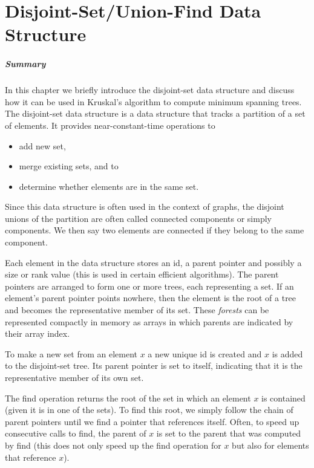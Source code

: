 \renewcommand\chapterformat{\thechapter\quad}
\chapter{Disjoint-Set/Union-Find Data Structure}

\paragraph{Summary}
In this chapter we briefly introduce the disjoint-set data structure and discuss
how it can be used in Kruskal's algorithm to compute minimum spanning trees.
\\

\noindent The disjoint-set data structure is a data structure that tracks a
partition of a set of elements. It provides near-constant-time operations to
\begin{itemize}
\item add new set,
\item merge existing sets, and to
\item determine whether elements are in the same set.
\end{itemize}
Since this data structure is often used in the context of graphs, the disjoint
unions of the partition are often called connected components or simply
components. We then say two elements are connected if they belong to the same
component.

Each element in the data structure stores an id, a parent pointer and possibly a
size or rank value (this is used in certain efficient algorithms). The parent
pointers are arranged to form one or more trees, each representing a set. If an
element's parent pointer points nowhere, then the element is the root of a tree
and becomes the representative member of its set. These \emph{forests} can be
represented compactly in memory as arrays in which parents are indicated by
their array index.

To make a new set from an element $x$ a new unique id is created and $x$ is
added to the disjoint-set tree. Its parent pointer is set to itself, indicating
that it is the representative member of its own set.

The find operation returns the root of the set in which an element $x$ is
contained (given it is in one of the sets). To find this root, we simply follow
the chain of parent pointers until we find a pointer that references
itself. Often, to speed up consecutive calls to find, the parent of $x$ is set
to the parent that was computed by find (this does not only speed up the find
operation for $x$ but also for elements that reference $x$).

